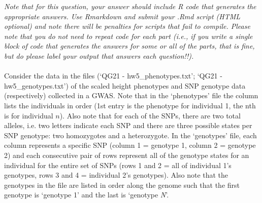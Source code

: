 \documentclass[letterpaper, 11pt]{article}
\begin{document}
\textit{Note that for this question, your answer should include R code that generates the appropriate answers.  Use Rmarkdown and submit your .Rmd script (HTML optional) and note there will be penalties for scripts that fail to compile.  Please note that you do not need to repeat code for each part (i.e., if you write a single block of code that generates the answers for some or all of the parts, that is fine, but do please label your output that answers each question!!).}
\\
\\
Consider the data in the files (`QG21 - hw5\_phenotypes.txt'; `QG21 - hw5\_genotypes.txt') of the scaled height phenotypes and SNP genotype data (respectively) collected in a GWAS.  Note that in the `phenotypes' file the column lists the individuals in order (1st entry is the phenotype for individual 1, the nth is for individual $n$).  Also note that for each of the SNPs, there are two total alleles, i.e. two letters indicate each SNP and there are three possible states per SNP genotype: two homozygotes and a heterozygote.  In the `genotypes' file, each column represents a specific SNP (column 1 = genotype 1, column 2 = genotype 2) and each consecutive pair of rows represent all of the genotype states for an individual for the entire set of SNPs (rows 1 and 2 = all of individual 1's genotypes, rows 3 and 4 = individual 2's genotypes).  Also note that the genotypes in the file are listed in order along the genome such that the first genotype is `genotype 1' and the last is `genotype \textit{N}'.
\end{document}
